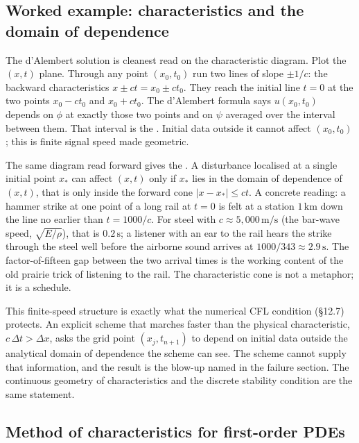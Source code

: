 \subsection{Worked example: characteristics and the domain of dependence}

The d'Alembert solution is cleanest read on the characteristic
diagram. Plot the $(x, t)$ plane. Through any point $(x_{0},
t_{0})$ run two lines of slope $\pm 1/c$: the backward
characteristics $x \pm c t = x_{0} \pm c t_{0}$. They reach the
initial line $t = 0$ at the two points $x_{0} - c t_{0}$ and
$x_{0} + c t_{0}$. The d'Alembert formula says $u(x_{0}, t_{0})$
depends on $\phi$ at exactly those two points and on $\psi$
averaged over the interval between them. That interval is the
. Initial data outside it cannot
affect $(x_{0}, t_{0})$; this is finite signal speed made
geometric.

The same diagram read forward gives the . A disturbance localised at a single initial point
$x_{*}$ can affect $(x, t)$ only if $x_{*}$ lies in the domain of
dependence of $(x, t)$, that is only inside the forward cone
$|x - x_{*}| \leq c t$. A concrete reading: a hammer strike at one
point of a long rail at $t = 0$ is felt at a station $1\,\si
{\kilo\meter}$ down the line no earlier than $t = 1000/c$. For steel
with $c \approx 5{,}000\,\si{\meter\per\second}$ (the bar-wave
speed, $\sqrt{E/\rho}$), that is $0.2\,\si{\second}$; a listener
with an ear to the rail hears the strike through the steel well
before the airborne sound arrives at $1000/343 \approx 2.9\,\si
{\second}$. The factor-of-fifteen gap between the two arrival times
is the working content of the old prairie trick of listening to the
rail. The characteristic cone is not a metaphor; it is a schedule.

This finite-speed structure is exactly what the numerical CFL
condition (\S12.7) protects. An explicit scheme that marches faster
than the physical characteristic, $c\,\Delta t > \Delta x$, asks the
grid point $(x_{j}, t_{n+1})$ to depend on initial data outside the
analytical domain of dependence the scheme can see. The scheme
cannot supply that information, and the result is the blow-up named
in the failure section. The continuous geometry of characteristics
and the discrete stability condition are the same statement.

\subsection{Method of characteristics for first-order PDEs}

